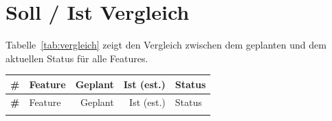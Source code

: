 \documentclass[11pt,a4paper]{scrartcl}
\begin{document}
\section{Soll / Ist Vergleich}

Tabelle~\ref{tab:vergleich} zeigt den Vergleich zwischen dem geplanten und dem
aktuellen Status für alle Features.

\begin{longtable}{>{\bfseries}p{0.5cm} p{6.5cm} r r l}
  \toprule
  \# & Feature & Geplant & Ist (est.) & Status \\
  \midrule
  \endfirsthead
  \toprule
  \# & Feature & Geplant & Ist (est.) & Status \\
  \midrule
  \endhead
  \bottomrule
  \endfoot
  \bottomrule
  \endlastfoot


\end{longtable}
\end{document}
